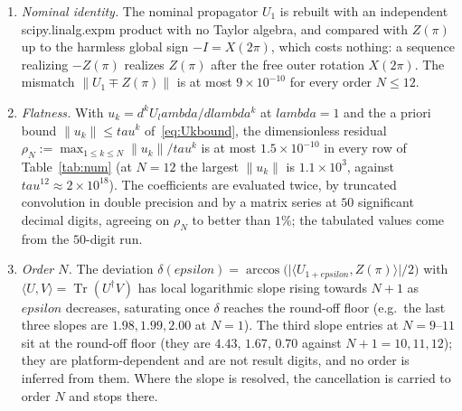 \documentclass[%
  aps,
  pra,
  preprint,
  superscriptaddress,
  amsmath,amssymb,
  nofootinbib,
  floatfix,
]{revtex4-2}
\def\lambda{lambda}\def\tau{tau}\def\phi{phi}\def\alpha{alpha}%
\def\eps{epsilon}\def\C{C}\def\R{R}\def\lean#1{#1}\def\mathrm#1{#1}%
\theoremstyle{definition}
\theoremstyle{remark}
\newcommand{\Tr}{\operatorname{Tr}}
\newcommand{\C}{\mathbb C}
\newcommand{\R}{\mathbb R}
\newcommand{\eps}{\varepsilon}
\newcommand{\tauvar}{\tau}
\DeclareRobustCommand{\lean}[1]{\path{#1}}
\begin{document}
\begin{enumerate}[label=(\roman*),leftmargin=2.1em,itemsep=0.15em]
\item \emph{Nominal identity.} The nominal propagator $U_1$ is rebuilt with an independent
  \lean{scipy.linalg.expm} product with no Taylor algebra, and compared
  with $Z(\pi)$ up to the harmless global sign $-I=X(2\pi)$, which costs nothing: a sequence
  realizing $-Z(\pi)$ realizes $Z(\pi)$ after the free outer rotation $X(2\pi)$.
  The mismatch $\lVert U_1\mp Z(\pi)\rVert$ is at most
  $9\times10^{-10}$ for every order $N\le12$.
\item \emph{Flatness.} With $u_k=\mathrm{d}^kU_\lambda/\mathrm{d}\lambda^k$ at $\lambda=1$ and the a priori
  bound $\lVert u_k\rVert\le\tauvar^k$ of~\eqref{eq:Ukbound}, the dimensionless residual
  $\rho_N:=\max_{1\le k\le N}\lVert u_k\rVert/\tauvar^k$ is at most
  $1.5\times10^{-10}$ in every row of Table~\ref{tab:num} (at $N=12$ the largest
  $\lVert u_k\rVert$ is $1.1\times10^{3}$, against
  $\tauvar^{12}\approx2\times10^{18}$). The coefficients are evaluated twice, by truncated
  convolution in double precision and by a matrix series at $50$ significant decimal digits, agreeing
  on $\rho_N$ to better than $1\%$; the tabulated values come from the $50$-digit run.
\item \emph{Order $N$.} The deviation
  $\delta(\eps)=\arccos\bigl(\lvert\langle U_{1+\eps},Z(\pi)\rangle\rvert/2\bigr)$ with
  $\langle U,V\rangle=\Tr(U^\dagger V)$ has local logarithmic slope rising towards $N+1$ as $\eps$
  decreases, saturating once $\delta$ reaches the round-off floor (e.g.\ the last three slopes are $1.98,1.99,2.00$ at $N=1$).
  The third slope entries at $N=9$--$11$ sit at the round-off floor (they are $4.43$, $1.67$,
  $0.70$ against $N+1=10,11,12$); they are platform-dependent and are not result digits, and
  no order is inferred from them. Where the slope is resolved, the cancellation is carried to
  order $N$ and stops there.
\end{enumerate}

\begin{table}[t]\centering\small
\caption{One admissible sequence per order at $\phi=\pi$, for $N\le12$: number $L$ of costly
segments, cost $T=\sum_j\theta_j$ in radians (so $T_{\min}(N,\pi)\le T$; no row is claimed to
be optimal or to be a certified minimum), ratio to the reference cost $(2N+1)\pi$ of
Ref.~\cite{Low2014}, and the independent re-verification described in the text---nominal
mismatch, dimensionless flatness residual
$\rho_N=\max_{k\le N}\lVert u_k\rVert/\tauvar^k$ of~\eqref{eq:Ukbound} with $\tauvar=T/2$, and
the last three local logarithmic slopes of $\delta(\eps)$, to be read against $N+1$. The angle
lists are distributed with the data set of Ref.~\cite{DataRepo}; slope entries that sit at the
round-off floor are not result digits.}
\label{tab:num}

\end{table}
\end{document}
